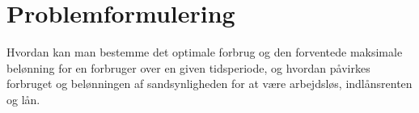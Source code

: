 \section{Problemformulering}

Hvordan kan man bestemme det optimale forbrug og den forventede maksimale belønning for en forbruger over en given tidsperiode, og hvordan påvirkes forbruget og belønningen af sandsynligheden for at være arbejdsløs, indlånsrenten og lån. 





